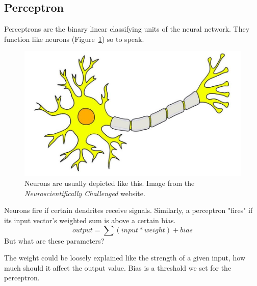 \subsection{Perceptron}
Perceptrons are the binary linear classifying units of the neural network. They function like neurons (Figure~\ref{fig:neuron}) so to speak.
\begin{figure}[!htb]
	\centering
	\includegraphics[scale=0.1]{neuron.jpg}
	\caption{Neurons are usually depicted like this. Image from the \textit{Neuroscientifically Challenged} website.}
	\label{fig:neuron}
\end{figure}
Neurons fire if certain dendrites receive signals. Similarly, a perceptron "fires" if its input vector's weighted sum is above a certain bias.
\[output = \sum (input * weight) + bias\]
But what are these parameters?

The weight could be loosely explained like the strength of a given input, how much should it affect the output value. Bias is a threshold we set for the perceptron.
